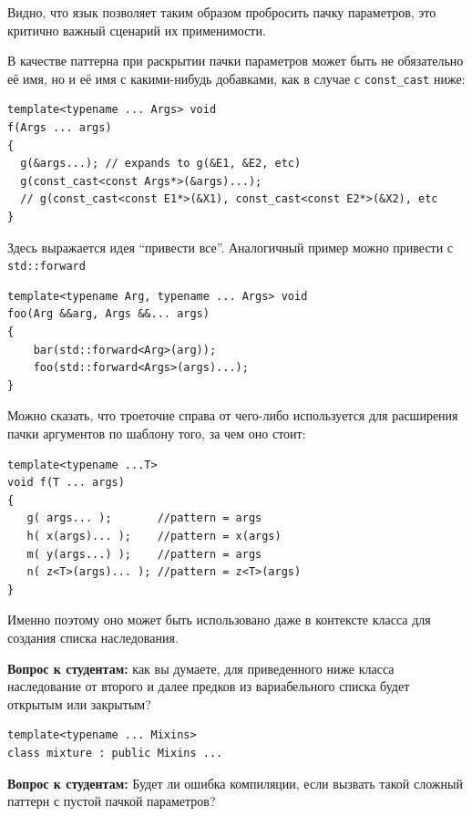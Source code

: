\documentclass[a4paper,12pt,oneside]{book}
\newif\ifanswers
\begin{document}
Видно, что язык позволяет таким образом пробросить пачку параметров, это критично важный сценарий их применимости.

В качестве паттерна при раскрытии пачки параметров может быть не обязательно её имя, но и её имя с какими-нибудь добавками, как в случае с \lstinline!const_cast! ниже:

\begin{lstlisting}
template<typename ... Args> void 
f(Args ... args)
{
  g(&args...); // expands to g(&E1, &E2, etc)
  g(const_cast<const Args*>(&args)...);
  // g(const_cast<const E1*>(&X1), const_cast<const E2*>(&X2), etc
}
\end{lstlisting}

Здесь выражается идея ``привести все''. Аналогичный пример можно привести с \lstinline!std::forward!

\begin{lstlisting}
template<typename Arg, typename ... Args> void 
foo(Arg &&arg, Args &&... args)
{
    bar(std::forward<Arg>(arg));
    foo(std::forward<Args>(args)...);
}
\end{lstlisting}

Можно сказать, что троеточие справа от чего-либо используется для расширения пачки аргументов по шаблону того, за чем оно стоит:

\begin{lstlisting}
template<typename ...T>
void f(T ... args) 
{
   g( args... );       //pattern = args
   h( x(args)... );    //pattern = x(args)
   m( y(args...) );    //pattern = args
   n( z<T>(args)... ); //pattern = z<T>(args)
}
\end{lstlisting}

Именно поэтому оно может быть использовано даже в контексте класса для создания списка наследования.

\textbf{Вопрос к студентам:} как вы думаете, для приведенного ниже класса наследование от второго и далее предков из вариабельного списка будет открытым или закрытым?

\begin{lstlisting}
template<typename ... Mixins>
class mixture : public Mixins ...  
\end{lstlisting}

\ifanswers
Правильный ответ: открытым, поскольку \lstinline!pattern = public Mixins!
\fi

\textbf{Вопрос к студентам:} Будет ли ошибка компиляции, если вызвать такой сложный паттерн с пустой пачкой параметров?

\ifanswers
Правильный ответ: все будет хорошо.
\fi
\end{document}
